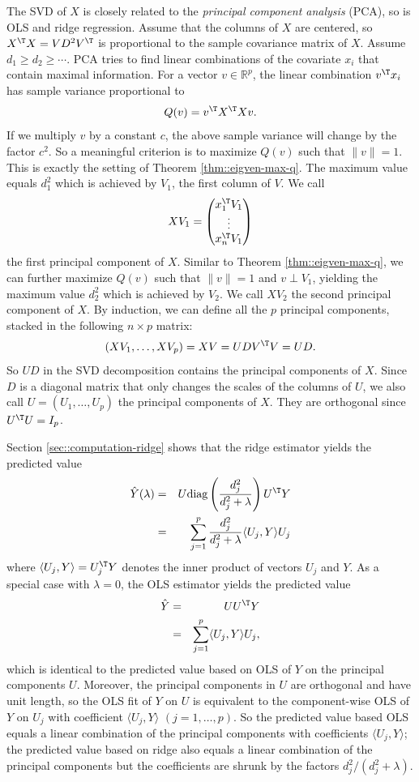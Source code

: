 The SVD of $X$ is closely related to the {\it principal component analysis} (PCA), so is OLS and ridge regression. Assume that the columns of $X$ are centered, so $X^{\T} X = VD^2V^{\T}$ is proportional to the sample covariance matrix of $X$. Assume $d_1 \geq d_2 \geq \cdots$. PCA tries to find linear combinations of the covariate $x_i$ that contain maximal information.   For a vector $v \in \mathbb{R}^p$, the linear combination $v^{\T} x_i $ has sample variance proportional to
$$
Q(v) = 
v^{\T} X^{\T} X v.
$$ 
If we multiply $v$ by a constant $c$, the above sample variance will change by the factor $c^2$. So a meaningful criterion is to maximize $Q(v)$ such that $\|v\| = 1$. This is exactly the setting of Theorem \ref{thm::eigven-max-q}. The maximum value equals $d_1^2$ which is achieved by $V_1$, the first column of $V$. We call
$$
XV_1 = \begin{pmatrix}
x_1^{\T} V_1 \\
\vdots \\
x_n^{\T} V_1
\end{pmatrix}
$$
the first principal component of $X$. Similar to Theorem  \ref{thm::eigven-max-q}, we can further maximize $ Q(v)$ such that $\|v\| = 1$ and $v\perp V_1$, yielding the maximum value $d_2^2$ which is achieved by $V_2$. We call $XV_2$ the second principal component of $X$. By induction, we can define all the $p$ principal components, stacked in the following $n\times p$ matrix: 
$$
(XV_1, \ldots, X V_p) =  XV = UDV^{\T} V = UD.
$$
So $UD$ in the SVD decomposition contains the principal components of $X$. Since $D$ is a diagonal matrix that only changes the scales of the columns of $U$, we also call $U = (U_1, \ldots, U_p)$ the principal components of $X$. They are orthogonal since $U^{\T} U = I_p$. 


Section \ref{sec::computation-ridge} shows that the ridge estimator yields the predicted value
\begin{eqnarray*}
\hat{Y}(\lambda)  &=&  U \text{diag}\left(  \frac{d_j^2}{d_j^2 + \lambda }  \right)  U^{\T} Y \\
&=& \sum_{j=1}^p   \frac{d_j^2}{d_j^2 + \lambda }  \langle U_j , Y\rangle     U_j 
\end{eqnarray*}
where $\langle U_j , Y\rangle = U_j^{\T} Y$ denotes the inner product of vectors $U_j $ and $ Y.$
As a special case with $\lambda = 0$, the OLS estimator yields the predicted value
\begin{eqnarray*}
\hat{Y}    &=& U  U^{\T} Y \\
&=& \sum_{j=1}^p    \langle U_j , Y\rangle     U_j ,
\end{eqnarray*}
which is identical to the predicted value based on OLS of $Y$ on the principal components $U$. Moreover, the principal components in $U$ are orthogonal and have unit length, so the OLS fit of $Y$ on $U$ is equivalent to the component-wise OLS of $Y$ on $U_j$ with coefficient $ \langle U_j , Y\rangle$ $(j=1,\ldots, p)$. So the predicted value based OLS equals a linear combination of the principal components with coefficients  $ \langle U_j , Y\rangle$; the predicted value based on ridge also equals a linear combination of the principal components but the coefficients are shrunk by the factors $d_j^2 / (d_j^2 + \lambda)$. 


